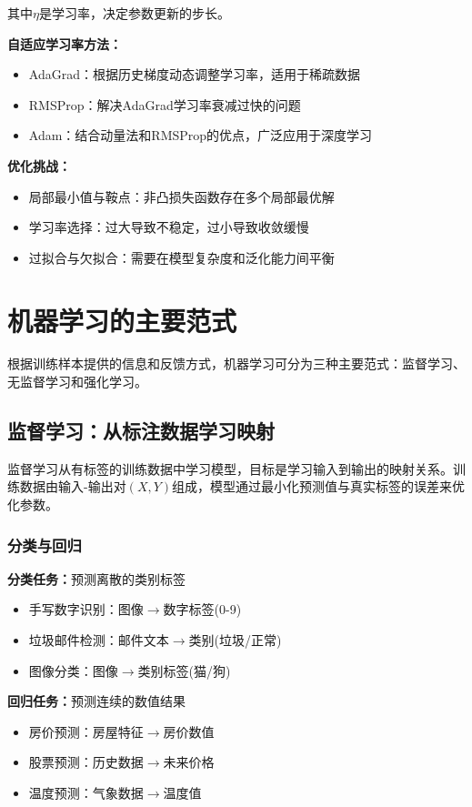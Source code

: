 其中$\eta$是学习率，决定参数更新的步长。

\textbf{自适应学习率方法：}
\begin{itemize}
\item AdaGrad：根据历史梯度动态调整学习率，适用于稀疏数据
\item RMSProp：解决AdaGrad学习率衰减过快的问题
\item Adam：结合动量法和RMSProp的优点，广泛应用于深度学习
\end{itemize}

\textbf{优化挑战：}
\begin{itemize}
\item 局部最小值与鞍点：非凸损失函数存在多个局部最优解
\item 学习率选择：过大导致不稳定，过小导致收敛缓慢
\item 过拟合与欠拟合：需要在模型复杂度和泛化能力间平衡
\end{itemize}

\section{机器学习的主要范式}

根据训练样本提供的信息和反馈方式，机器学习可分为三种主要范式：监督学习、无监督学习和强化学习。

\subsection{监督学习：从标注数据学习映射}

监督学习从有标签的训练数据中学习模型，目标是学习输入到输出的映射关系。训练数据由输入-输出对$(X, Y)$组成，模型通过最小化预测值与真实标签的误差来优化参数。

\subsubsection{分类与回归}

\textbf{分类任务：}预测离散的类别标签
\begin{itemize}
\item 手写数字识别：图像$\rightarrow$数字标签(0-9)
\item 垃圾邮件检测：邮件文本$\rightarrow$类别(垃圾/正常)
\item 图像分类：图像$\rightarrow$类别标签(猫/狗)
\end{itemize}

\textbf{回归任务：}预测连续的数值结果
\begin{itemize}
\item 房价预测：房屋特征$\rightarrow$房价数值
\item 股票预测：历史数据$\rightarrow$未来价格
\item 温度预测：气象数据$\rightarrow$温度值
\end{itemize}

